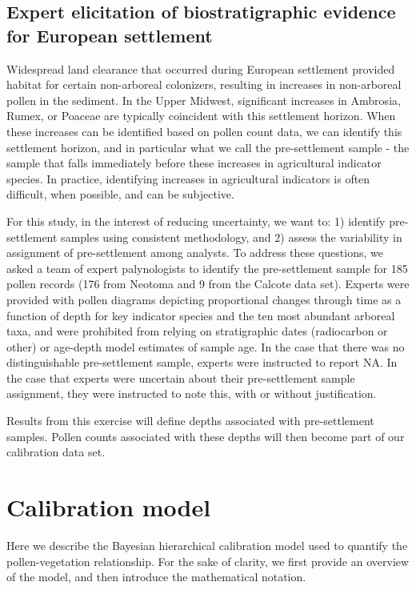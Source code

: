 \documentclass[12pt]{article}
\begin{document}
\subsection{Expert elicitation of biostratigraphic evidence for European settlement}
Widespread land clearance that occurred during European settlement
provided habitat for certain non-arboreal colonizers, resulting in
increases in non-arboreal pollen in the sediment. In the Upper
Midwest, significant increases in Ambrosia, Rumex, or Poaceae are
typically coincident with this settlement horizon. When these
increases can be identified based on pollen count data, we can
identify this settlement horizon, and in particular what we call the
pre-settlement sample - the sample that falls immediately before these
increases in agricultural indicator species. In practice, identifying
increases in agricultural indicators is often difficult, when
possible, and can be subjective. 

For this study, in the interest of reducing uncertainty, we want to:
1) identify pre-settlement samples using consistent methodology, and
2) assess the variability in assignment of pre-settlement among
analysts. To address these questions, we asked a team of expert
palynologists to identify the pre-settlement sample for 185 pollen
records (176 from Neotoma and 9 from the Calcote data set). Experts
were provided with pollen diagrams depicting proportional changes
through time as a function of depth for key indicator species and the
ten most abundant arboreal taxa, and were prohibited from relying on
stratigraphic dates (radiocarbon or other) or age-depth model
estimates of sample age. In the case that there was no distinguishable
pre-settlement sample, experts were instructed to report NA. In the
case that experts were uncertain about their pre-settlement sample
assignment, they were instructed to note this, with or without
justification. 

Results from this exercise will define depths associated with
pre-settlement samples. Pollen counts associated with these depths
will then become part of our calibration data set.

\section{Calibration model}

Here we describe the Bayesian hierarchical calibration model used to
quantify the pollen-vegetation relationship. For the sake of clarity,
we first provide an overview of the model, and then introduce the
mathematical notation.
\end{document}
